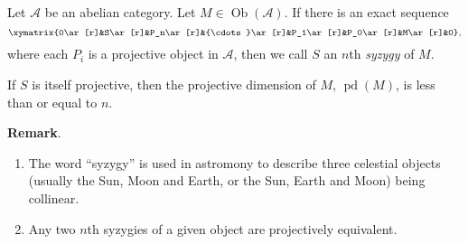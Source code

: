 \documentclass[12pt]{article}
\begin{document}
Let $\mathcal{A}$ be an abelian category.  Let $M\in\operatorname{Ob}(\mathcal{A})$.  If there is an exact sequence
$$\xymatrix{0\ar[r]&S\ar[r]&P_n\ar[r]&{\cdots}\ar[r]&P_1\ar[r]&P_0\ar[r]&M\ar[r]&0},$$
where each $P_i$ is a projective object in $\mathcal{A}$, then we call $S$ an $n$th \emph{syzygy} of $M$.

If $S$ is itself projective, then the projective dimension of $M$, $\operatorname{pd}(M)$, is less than or equal to $n$.

\textbf{Remark}.  
\begin{enumerate}
\item The word ``syzygy'' is used in astromony to describe three celestial objects (usually the Sun, Moon and Earth, or the Sun, Earth and Moon) being collinear. 
\item Any two $n$th syzygies of a given object are projectively equivalent.
\end{enumerate}
\end{document}
